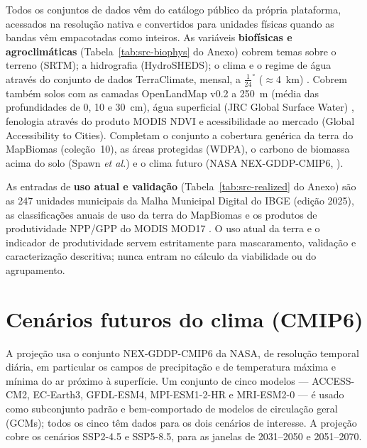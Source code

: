 
Todos os conjuntos de dados vêm do catálogo público da própria plataforma, acessados na resolução nativa e
convertidos para unidades físicas quando as bandas vêm empacotadas como inteiros. As variáveis
\textbf{biofísicas e agroclimáticas} (Tabela~\ref{tab:src-biophys} do Anexo) cobrem temas sobre o
terreno (SRTM); a hidrografia (HydroSHEDS); o clima e o regime de água
através do conjunto de dados TerraClimate, mensal, a $\tfrac{1}{24}^\circ$ ($\approx$4~km)
\citep{abatzoglou_terraclimate_2018}. Cobrem também solos com as camadas OpenLandMap v0.2 a 250~m
(média das profundidades de 0, 10 e 30~cm), %
água superficial (JRC Global Surface Water) \citep{pekel_high-resolution_2016}, fenologia através do produto MODIS NDVI e
acessibilidade ao mercado (Global Accessibility to Cities). Completam o conjunto a cobertura genérica da terra
do MapBiomas (coleção~10), as áreas protegidas (WDPA), o carbono de biomassa acima do
solo (Spawn \emph{et al.}) e o clima futuro (NASA NEX-GDDP-CMIP6, \citealp{thrasher_nasa_2022}).

As entradas de \textbf{uso atual e validação} (Tabela~\ref{tab:src-realized} do Anexo) são as 247
unidades municipais da Malha Municipal Digital do IBGE (edição 2025), as classificações anuais de uso da
terra do MapBiomas \citep{souza_reconstructing_2020} e os produtos de
produtividade NPP/GPP do MODIS MOD17 \citep{zhao_improvements_2005}. O uso atual da terra e o indicador de produtividade
servem estritamente para mascaramento, validação e caracterização descritiva; nunca entram no cálculo da
viabilidade ou do agrupamento.

\section{Cenários futuros do clima (CMIP6)}

A projeção usa o conjunto NEX-GDDP-CMIP6 da NASA, de resolução temporal diária, em particular os campos de
precipitação e de temperatura máxima e mínima do ar próximo à superfície. Um conjunto de cinco modelos ---
ACCESS-CM2, EC-Earth3, GFDL-ESM4, MPI-ESM1-2-HR e MRI-ESM2-0 --- é usado como subconjunto padrão e
bem-comportado de modelos de circulação geral (GCMs); todos os cinco têm dados para os dois cenários de
interesse. A projeção cobre os cenários SSP2-4.5 e SSP5-8.5, para as janelas de 2031--2050 e 2051--2070.

